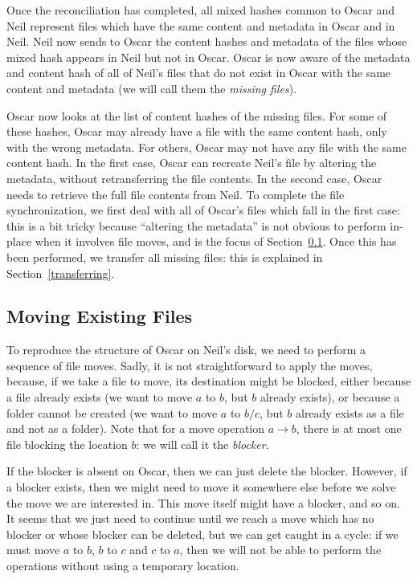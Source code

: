 \documentclass[11pt]{llncs}
\begin{document}
Once the reconciliation has completed, all mixed hashes common to Oscar and Neil
represent files which have the same content and metadata in Oscar and in Neil.
Neil now sends to Oscar the content hashes and metadata of the files whose mixed
hash appears in Neil but not in Oscar. Oscar is now aware of the metadata and
content hash of all of Neil's files that do not exist in Oscar with the same
content and metadata (we will call them the \emph{missing files}).

Oscar now looks at the list of content hashes of the missing files. For some of
these hashes, Oscar may already have a file with the same content hash, only
with the wrong metadata. For others, Oscar may not have any file with the same
content hash. In the first case, Oscar can recreate Neil's file by altering the
metadata, without retransferring the file contents. In the second case, Oscar
needs to retrieve the full file contents from Neil. To complete the file
synchronization, we first deal with all of Oscar's files which fall in the first
case: this is a bit tricky because ``altering the metadata'' is not obvious to
perform in-place when it involves file moves, and is the focus of
Section~\ref{moving}. Once this has been performed, we transfer all missing
files: this is explained in Section~\ref{transferring}.

\subsection{Moving Existing Files}
\label{moving}

To reproduce the structure of Oscar on Neil's disk, we need to perform a sequence of file moves. Sadly, it is not straightforward to apply the moves, because, if we take a file to move, its destination might be blocked, either because a file already exists (we want to move $a$ to $b$, but $b$ already exists), or because a folder cannot be created (we want to move $a$ to $b/c$, but $b$ already exists as a file and not as a folder). Note that for a move operation $a \rightarrow b$, there is at most one file blocking the location $b$: we will call it the \textit{blocker}.

If the blocker is absent on Oscar, then we can just delete the blocker. However, if a blocker exists, then we might need to move it somewhere else before we solve the move we are interested in. This move itself might have a blocker, and so on. It seems that we just need to continue until we reach a move which has no blocker or whose blocker can be deleted, but we can get caught in a cycle: if we must move $a$ to $b$, $b$ to $c$ and $c$ to $a$, then we will not be able to perform the operations without using a temporary location.
\end{document}
